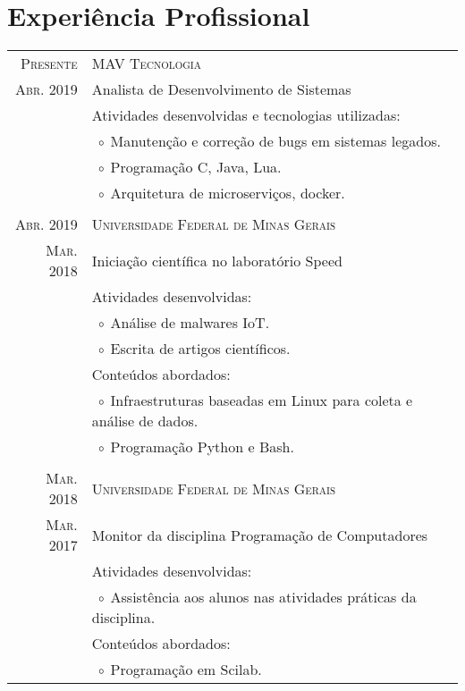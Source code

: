 \documentclass[a4paper,10pt]{article}
\newcommand{\tabitem}{$\;\circ\;$}
\newcommand{\cpp}{C\protect\scalebox{0.8}{\protect\raisebox{0.4ex}{++}}}
\renewcommand\#{\protect\scalebox{0.8}{\protect\raisebox{0.4ex}{\char"0023}}}
\begin{document}
\section{Experiência Profissional}
\begin{tabular}{r|p{12.3cm}}
  \textsc{Presente} & \textsc{MAV Tecnologia} \\
  \textsc{Abr. 2019} & Analista de Desenvolvimento de Sistemas \\[5pt]
  & Atividades desenvolvidas e tecnologias utilizadas: \\
  & \tabitem Manutenção e correção de bugs em sistemas legados. \\
  & \tabitem Programação \cpp, Java, Lua. \\
  & \tabitem Arquitetura de microserviços, docker. \\

  \multicolumn{2}{c}{} \\
  \textsc{Abr. 2019} & \textsc{Universidade Federal de Minas Gerais} \\
  \textsc{Mar. 2018} & Iniciação científica no laboratório Speed \\[5pt]
  & Atividades desenvolvidas: \\
  & \tabitem Análise de malwares IoT. \\
  & \tabitem Escrita de artigos científicos. \\
  & Conteúdos abordados: \\
  & \tabitem Infraestruturas baseadas em Linux para coleta e análise de dados. \\
  & \tabitem Programação Python e Bash. \\

  \multicolumn{2}{c}{} \\
  \textsc{Mar. 2018} & \textsc{Universidade Federal de Minas Gerais} \\
  \textsc{Mar. 2017} & Monitor da disciplina Programação de Computadores \\[5pt]
  & Atividades desenvolvidas: \\
  & \tabitem Assistência aos alunos nas atividades práticas da disciplina. \\
  & Conteúdos abordados: \\
  & \tabitem Programação em Scilab. \\
  

\end{tabular}
\end{document}

